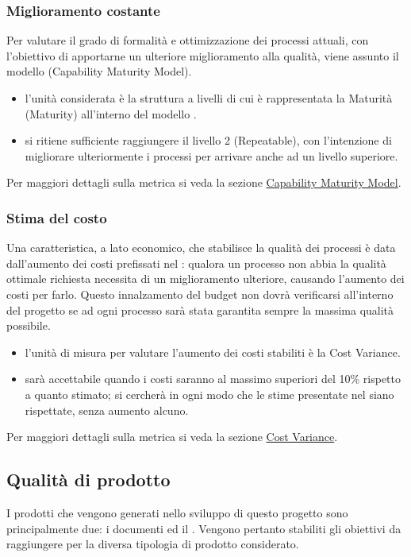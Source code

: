 \documentclass[a4paper, titlepage]{article}
\begin{document}
\subsubsection{Miglioramento costante}
Per valutare il grado di formalità e ottimizzazione dei processi attuali, con l'obiettivo di apportarne un ulteriore miglioramento alla qualità, viene assunto il modello  (Capability Maturity Model).
\begin{itemize}
\item {} l'unità considerata è la struttura a livelli di cui è rappresentata la Maturità (Maturity) all'interno del modello .
\item {} si ritiene sufficiente raggiungere il livello 2 (Repeatable), con l'intenzione di migliorare ulteriormente i processi per arrivare anche ad un livello superiore.
\end{itemize}
Per maggiori dettagli sulla metrica si veda la sezione \hyperref[par:cmm]{Capability Maturity Model}. 

\subsubsection{Stima del costo}
Una caratteristica, a lato economico, che stabilisce la qualità dei processi è data dall'aumento dei costi prefissati nel : qualora un processo non abbia la qualità ottimale richiesta necessita di un miglioramento ulteriore, causando l'aumento dei costi per farlo.
\newline Questo innalzamento del budget non dovrà verificarsi all'interno del progetto se ad ogni processo sarà stata garantita sempre la massima qualità possibile.
\begin{itemize}
\item {} l'unità di misura per valutare l'aumento dei costi stabiliti è la Cost Variance.
\item {} sarà accettabile quando i costi saranno al massimo superiori del 10\% rispetto a quanto stimato; si cercherà in ogni modo che le stime presentate nel  siano rispettate, senza aumento alcuno.
\end{itemize}
Per maggiori dettagli sulla metrica si veda la sezione \hyperref[par:CV]{Cost Variance}.

\subsection{Qualità di prodotto}
\label{sec:qualprod}
I prodotti che vengono generati nello sviluppo di questo progetto sono principalmente due: i documenti ed il . Vengono pertanto stabiliti gli obiettivi da raggiungere per la diversa tipologia di prodotto considerato.
\end{document}
